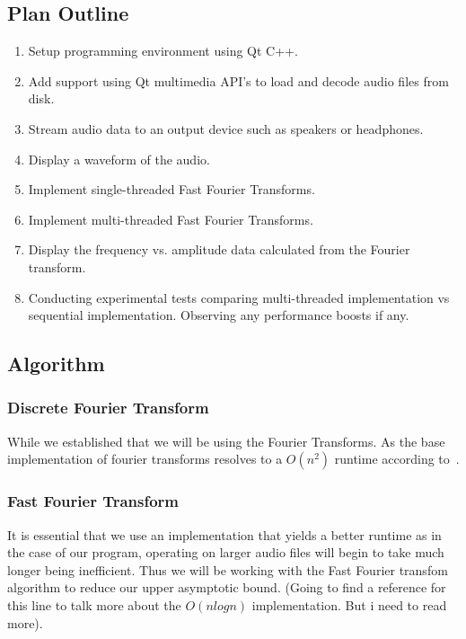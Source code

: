 \documentclass[journal]{IEEEtran}
\begin{document}
\subsection{Plan Outline}

\begin{enumerate}
	\item Setup programming environment using Qt C++.
	\item Add support using Qt multimedia API's to load and decode audio files from disk.
	\item Stream audio data to an output device such as speakers or headphones.
	\item Display a waveform of the audio.
	\item Implement single-threaded Fast Fourier Transforms.
	\item Implement multi-threaded Fast Fourier Transforms.
	\item Display the frequency vs. amplitude data calculated from the Fourier transform.
	\item Conducting experimental tests comparing multi-threaded implementation vs sequential implementation.
Observing any performance boosts if any.
\end{enumerate}

\subsection{Algorithm}

\subsubsection{Discrete Fourier Transform}
	\par While we established that we will be using the Fourier Transforms. As the base implementation of fourier transforms resolves to a $O(n^2)$ runtime according to~\cite{Xie}.
\subsubsection{Fast Fourier Transform}
	\par It is essential that we use an implementation that yields a better runtime as in the case of our program, operating on larger audio files will begin to take much longer being inefficient. Thus we will be working with the Fast Fourier transfom algorithm to reduce our upper asymptotic bound.  (Going to find a reference for this line to talk more about the $O(nlog{}n)$ implementation. But i need to read more).
\end{document}
